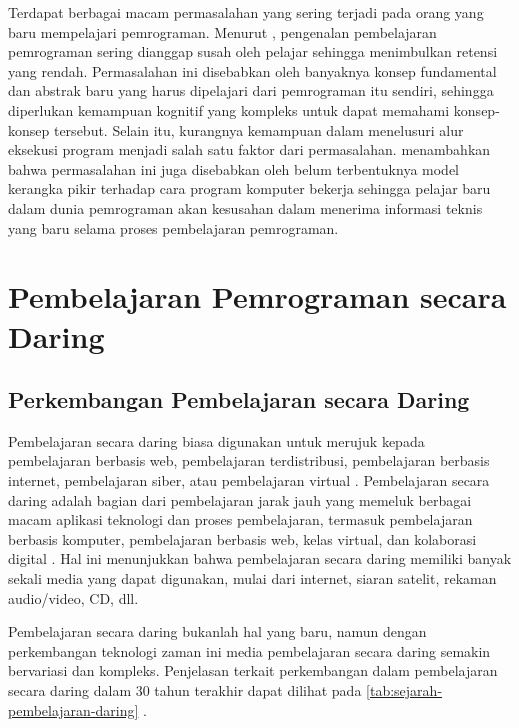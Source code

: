 Terdapat berbagai macam permasalahan yang sering terjadi pada orang yang baru mempelajari pemrograman. Menurut \textcite{moons2013pilot}, pengenalan pembelajaran pemrograman sering dianggap susah oleh pelajar sehingga menimbulkan retensi yang rendah. Permasalahan ini disebabkan oleh banyaknya konsep fundamental dan abstrak baru yang harus dipelajari dari pemrograman itu sendiri, sehingga diperlukan kemampuan kognitif yang kompleks untuk dapat memahami konsep-konsep tersebut. Selain itu, kurangnya kemampuan dalam menelusuri alur eksekusi program menjadi salah satu faktor dari permasalahan. \textcite{mayer1981psychology} menambahkan bahwa permasalahan ini juga disebabkan oleh belum terbentuknya model kerangka pikir terhadap cara program komputer bekerja sehingga pelajar baru dalam dunia pemrograman akan kesusahan dalam menerima informasi teknis yang baru selama proses pembelajaran pemrograman.



\section{Pembelajaran Pemrograman secara Daring}
\subsection{Perkembangan Pembelajaran secara Daring}
Pembelajaran secara daring biasa digunakan untuk merujuk kepada pembelajaran berbasis web, pembelajaran terdistribusi, pembelajaran berbasis internet, pembelajaran siber, atau pembelajaran virtual \parencite{urdan2000elearning}. Pembelajaran secara daring adalah bagian dari pembelajaran jarak jauh yang memeluk berbagai macam aplikasi teknologi dan proses pembelajaran, termasuk pembelajaran berbasis komputer, pembelajaran berbasis web, kelas virtual, dan kolaborasi digital \parencite{urdan2000elearning}. Hal ini menunjukkan bahwa pembelajaran secara daring memiliki banyak sekali media yang dapat digunakan, mulai dari internet, siaran satelit, rekaman audio/video, CD, dll.

Pembelajaran secara daring bukanlah hal yang baru, namun dengan perkembangan teknologi zaman ini media pembelajaran secara daring semakin bervariasi dan kompleks. Penjelasan terkait perkembangan dalam pembelajaran secara daring dalam 30 tahun terakhir dapat dilihat pada \autoref{tab:sejarah-pembelajaran-daring} \parencite{keengwe2010towards}.

